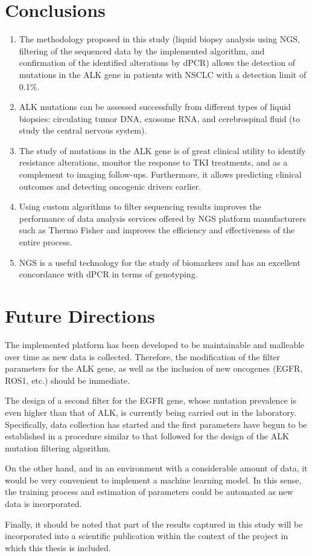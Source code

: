 \section{Conclusions}

\begin{enumerate}
    \item The methodology proposed in this study (liquid biopsy analysis using NGS, filtering of the sequenced data by the implemented algorithm, and confirmation of the identified alterations by dPCR) allows the detection of mutations in the ALK gene in patients with NSCLC with a detection limit of 0.1\%.
    \item ALK mutations can be assessed successfully from different types of liquid biopsies: circulating tumor DNA, exosome RNA, and cerebrospinal fluid (to study the central nervous system).
    \item The study of mutations in the ALK gene is of great clinical utility to identify resistance alterations, monitor the response to TKI treatments, and as a complement to imaging follow-ups. Furthermore, it allows predicting clinical outcomes and detecting oncogenic drivers earlier.
    \item Using custom algorithms to filter sequencing results improves the performance of data analysis services offered by NGS platform manufacturers such as Thermo Fisher and improves the efficiency and effectiveness of the entire process.
    \item NGS is a useful technology for the study of biomarkers and has an excellent concordance with dPCR in terms of genotyping.
\end{enumerate}

\section{Future Directions}

The implemented platform has been developed to be maintainable and malleable over time as new data is collected. Therefore, the modification of the filter parameters for the ALK gene, as well as the inclusion of new oncogenes (EGFR, ROS1, etc.) should be immediate.

The design of a second filter for the EGFR gene, whose mutation prevalence is even higher than that of ALK, is currently being carried out in the laboratory. Specifically, data collection has started and the first parameters have begun to be established in a procedure similar to that followed for the design of the ALK mutation filtering algorithm.

On the other hand, and in an environment with a considerable amount of data, it would be very convenient to implement a machine learning model. In this sense, the training process and estimation of parameters could be automated as new data is incorporated.

Finally, it should be noted that part of the results captured in this study will be incorporated into a scientific publication within the context of the project in which this thesis is included.
